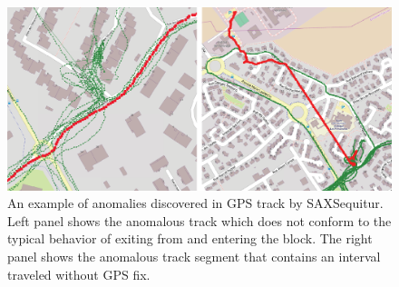 \documentclass{llncs}
\begin{document}
\begin{figure}[t]
   \centering
   \vspace{-0.5cm}   
   \includegraphics[width=122mm]{gps_zoom.eps}
   \caption{An example of anomalies discovered in GPS track by SAXSequitur. Left panel shows the anomalous track which does not conform to the typical behavior of exiting from and entering the block. The right panel shows the anomalous track segment that contains an interval traveled without GPS fix.}
   \label{fig:gps2}
   \vspace{-0.35cm}   
\end{figure}
\end{document}
